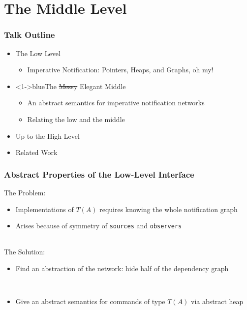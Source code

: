 \documentclass[svgnames]{beamer}
\newcommand{\blue}[2]{{\color<{#1}>{blue}{#2}}}
\begin{document}
\section{The Middle Level}
\begin{frame}
  \frametitle{Talk Outline}
  \begin{itemize}
      
    \item The Low Level
      \begin{itemize}
        \item Imperative Notification: Pointers, Heaps, and Graphs, oh my!
      \end{itemize}
    \item \blue{1-}{The \sout{Messy} Elegant Middle}
      \begin{itemize}
        \item An abstract semantics for imperative notification networks
        \item Relating the low and the middle
      \end{itemize}
    \item Up to the High Level    \item Related Work
  \end{itemize}
\end{frame}

\begin{frame}
  \frametitle{Abstract Properties of the Low-Level Interface}

  The Problem:
    \begin{itemize}
      \item Implementations of $T(A)$ requires knowing the whole
        notification graph
        
      \item Arises because of symmetry of \texttt{sources} and 
        \texttt{observers}
    \end{itemize}

  \pause
  \ \\
  The Solution:
    \begin{itemize}
      \item Find an abstraction of the network: hide half of 
        the dependency graph
        
        \ \\ 
      \item Give an abstract semantics for commands of type $T(A)$ via 
        abstract heap
    \end{itemize}
\end{frame}
\end{document}
